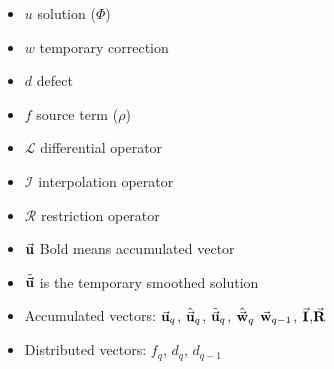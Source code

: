 		\begin{itemize}
			\item \(u\) solution (\(\Phi\))
			\item \(w\) temporary correction
			\item \(d\) defect
			\item \(f\) source term (\(\rho\))
			\item \(\mathcal{L}\) differential operator
			\item \(\mathcal{I}\) interpolation operator
			\item \(\mathcal{R}\) restriction operator
			\item \( \va{u}\) Bold means accumulated vector
			\item \( \tilde{\va{ u }} \) is the temporary smoothed solution
		\end{itemize}

		\begin{itemize}
			\item Accumulated vectors:	\(\va{u}_q\), \( \hat{\va{u}}_q \), \(\tilde{\va{u}}_q\), \(\hat{\va{w}}_q\) \(\va{w}_{q-1}\), \(\va{I}\),\(\va{R}\)
			\item Distributed vectors:  \( f_q \), \(d_q\), \(d_{q-1}\)
		\end{itemize}


